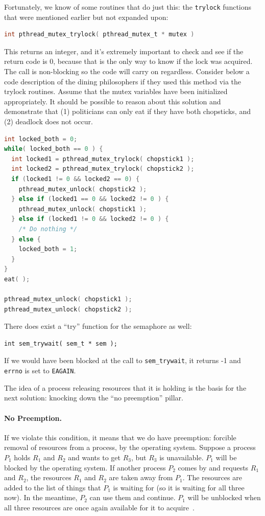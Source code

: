 Fortunately, we know of some routines that do just this: the \texttt{trylock} functions that were mentioned earlier but not expanded upon:
\begin{lstlisting}[language=C]
int pthread_mutex_trylock( pthread_mutex_t * mutex )
\end{lstlisting}

This returns an integer, and it's extremely important to check and see if the return code is 0, because that is the only way to know if the lock was acquired. The call is non-blocking so the code will carry on regardless. Consider below a code description of the dining philosophers if they used this method via the trylock routines. Assume that the mutex variables have been initialized appropriately. It should be possible to reason about this solution and demonstrate that (1) politicians can only eat if they have both chopsticks, and (2) deadlock does not occur.

\begin{lstlisting}[language=C]
int locked_both = 0;
while( locked_both == 0 ) {
  int locked1 = pthread_mutex_trylock( chopstick1 );
  int locked2 = pthread_mutex_trylock( chopstick2 );
  if (locked1 != 0 && locked2 == 0) {
    pthread_mutex_unlock( chopstick2 );
  } else if (locked1 == 0 && locked2 != 0 ) {
    pthread_mutex_unlock( chopstick1 );
  } else if (locked1 != 0 && locked2 != 0 ) {
    /* Do nothing */
  } else {
    locked_both = 1;
  }
}
eat( );

pthread_mutex_unlock( chopstick1 );
pthread_mutex_unlock( chopstick2 );
\end{lstlisting}

There does exist a ``try'' function for the semaphore as well:

\begin{lstlisting}
int sem_trywait( sem_t * sem );
\end{lstlisting}

If we would have been blocked at the call to \texttt{sem\_trywait}, it returns -1 and \texttt{errno} is set to \texttt{EAGAIN}.

The idea of a process releasing resources that it is holding is the basis for the next solution: knocking down the ``no preemption'' pillar.


\paragraph{No Preemption.} If we violate this condition, it means that we do have preemption: forcible removal of resources from a process, by the operating system. Suppose a process $P_{1}$ holds $R_{1}$ and $R_{2}$ and wants to get $R_{3}$, but $R_{3}$ is unavailable. $P_{1}$ will be blocked by the operating system. If another process $P_{2}$ comes by and requests $R_{1}$ and $R_{2}$, the resources $R_{1}$ and $R_{2}$ are taken away from $P_{1}$. The resources are added to the list of things that $P_{1}$ is waiting for (so it is waiting for all three now). In the meantime, $P_{2}$ can use them and continue. $P_{1}$ will be unblocked when all three resources are once again available for it to acquire~\cite{osc}.

